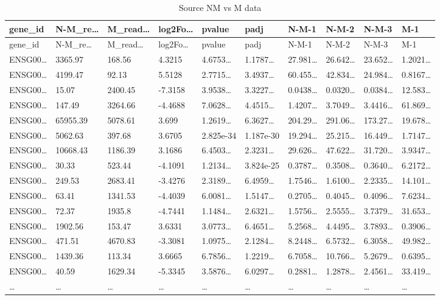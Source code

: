\documentclass[
]{article}
\begin{document}
\begin{longtable}[]{@{}llllllllll@{}}
\caption{\label{tab:Source-NM-vs-M-data}Source NM vs M data}\tabularnewline
\toprule
gene\_id & N-M\_re\ldots{} & M\_read\ldots{} & log2Fo\ldots{} & pvalue & padj & N-M-1 & N-M-2 & N-M-3 & M-1\tabularnewline
\midrule
\endfirsthead
\toprule
gene\_id & N-M\_re\ldots{} & M\_read\ldots{} & log2Fo\ldots{} & pvalue & padj & N-M-1 & N-M-2 & N-M-3 & M-1\tabularnewline
\midrule
\endhead
ENSG00\ldots{} & 3365.97 & 168.56 & 4.3215 & 4.6753\ldots{} & 1.1787\ldots{} & 27.981\ldots{} & 26.642\ldots{} & 23.652\ldots{} & 1.2021\ldots{}\tabularnewline
ENSG00\ldots{} & 4199.47 & 92.13 & 5.5128 & 2.7715\ldots{} & 3.4937\ldots{} & 60.455\ldots{} & 42.834\ldots{} & 24.984\ldots{} & 0.8167\ldots{}\tabularnewline
ENSG00\ldots{} & 15.07 & 2400.45 & -7.3158 & 3.9538\ldots{} & 3.3227\ldots{} & 0.0438\ldots{} & 0.0320\ldots{} & 0.0384\ldots{} & 12.583\ldots{}\tabularnewline
ENSG00\ldots{} & 147.49 & 3264.66 & -4.4688 & 7.0628\ldots{} & 4.4515\ldots{} & 1.4207\ldots{} & 3.7049\ldots{} & 3.4416\ldots{} & 61.869\ldots{}\tabularnewline
ENSG00\ldots{} & 65955.39 & 5078.61 & 3.699 & 1.2619\ldots{} & 6.3627\ldots{} & 204.29\ldots{} & 291.06\ldots{} & 173.27\ldots{} & 19.678\ldots{}\tabularnewline
ENSG00\ldots{} & 5062.63 & 397.68 & 3.6705 & 2.825e-34 & 1.187e-30 & 19.294\ldots{} & 25.215\ldots{} & 16.449\ldots{} & 1.7147\ldots{}\tabularnewline
ENSG00\ldots{} & 10668.43 & 1186.39 & 3.1686 & 6.4503\ldots{} & 2.3231\ldots{} & 29.626\ldots{} & 47.622\ldots{} & 31.720\ldots{} & 3.9347\ldots{}\tabularnewline
ENSG00\ldots{} & 30.33 & 523.44 & -4.1091 & 1.2134\ldots{} & 3.824e-25 & 0.3787\ldots{} & 0.3508\ldots{} & 0.3640\ldots{} & 6.2172\ldots{}\tabularnewline
ENSG00\ldots{} & 249.53 & 2683.41 & -3.4276 & 2.3189\ldots{} & 6.4959\ldots{} & 1.7546\ldots{} & 1.6100\ldots{} & 2.2335\ldots{} & 14.101\ldots{}\tabularnewline
ENSG00\ldots{} & 63.41 & 1341.53 & -4.4039 & 6.0081\ldots{} & 1.5147\ldots{} & 0.2705\ldots{} & 0.4045\ldots{} & 0.4096\ldots{} & 7.6234\ldots{}\tabularnewline
ENSG00\ldots{} & 72.37 & 1935.8 & -4.7441 & 1.1484\ldots{} & 2.6321\ldots{} & 1.5756\ldots{} & 2.5555\ldots{} & 3.7379\ldots{} & 31.653\ldots{}\tabularnewline
ENSG00\ldots{} & 1902.56 & 153.47 & 3.6331 & 3.0773\ldots{} & 6.4651\ldots{} & 5.2568\ldots{} & 4.4495\ldots{} & 3.7893\ldots{} & 0.3906\ldots{}\tabularnewline
ENSG00\ldots{} & 471.51 & 4670.83 & -3.3081 & 1.0975\ldots{} & 2.1284\ldots{} & 8.2448\ldots{} & 6.5732\ldots{} & 6.3058\ldots{} & 49.982\ldots{}\tabularnewline
ENSG00\ldots{} & 1439.36 & 113.34 & 3.6665 & 6.7856\ldots{} & 1.2219\ldots{} & 6.7058\ldots{} & 10.766\ldots{} & 5.2679\ldots{} & 0.6395\ldots{}\tabularnewline
ENSG00\ldots{} & 40.59 & 1629.34 & -5.3345 & 3.5876\ldots{} & 6.0297\ldots{} & 0.2881\ldots{} & 1.2878\ldots{} & 2.4561\ldots{} & 33.419\ldots{}\tabularnewline
\ldots{} & \ldots{} & \ldots{} & \ldots{} & \ldots{} & \ldots{} & \ldots{} & \ldots{} & \ldots{} & \ldots{}\tabularnewline
\bottomrule
\end{longtable}
\end{document}
